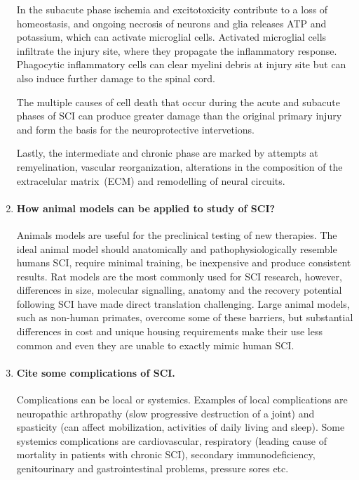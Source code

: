 \documentclass[12pt,article,oneside,a4paper]{memoir}
\begin{document}
\begin{enumerate}
In the subacute phase ischemia and excitotoxicity contribute to a loss of
homeostasis, and ongoing necrosis of neurons and glia releases ATP and
potassium, which can activate microglial cells. Activated microglial cells
infiltrate the injury site, where they propagate the inflammatory response.
Phagocytic inflammatory cells can clear myelini debris at injury site but can
also induce further damage to the spinal cord.

The multiple causes of cell death that occur during the acute and subacute
phases of SCI can produce greater damage than the original primary injury and
form the basis for the neuroprotective intervetions.

Lastly, the intermediate and chronic phase are marked by attempts at
remyelination, vascular reorganization, alterations in the composition of the
extracelular matrix~(ECM) and remodelling of neural circuits.

\item \paragraph{How animal models can be applied to study of SCI?}
Animals models are useful for the preclinical testing of new therapies.
The ideal animal model should anatomically and pathophysiologically resemble
humans SCI, require minimal training, be inexpensive and produce consistent
results. Rat models are the most commonly used for SCI research, however,
differences in size, molecular signalling, anatomy and the recovery potential
following SCI have made direct translation challenging.
Large animal models, such as non-human primates, overcome some of these
barriers, but substantial differences in cost and unique housing requirements
make their use less common and even they are unable to exactly mimic human SCI.

\item \paragraph{Cite some complications of SCI.}
Complications can be local or systemics. Examples of local complications are
neuropathic arthropathy (slow progressive destruction of a joint) and
spasticity (can affect mobilization, activities of daily living and sleep).
Some systemics complications are cardiovascular, respiratory (leading cause of
mortality in patients with chronic SCI), secondary immunodeficiency,
genitourinary and gastrointestinal problems, pressure sores etc.


\end{enumerate}
\end{document}

